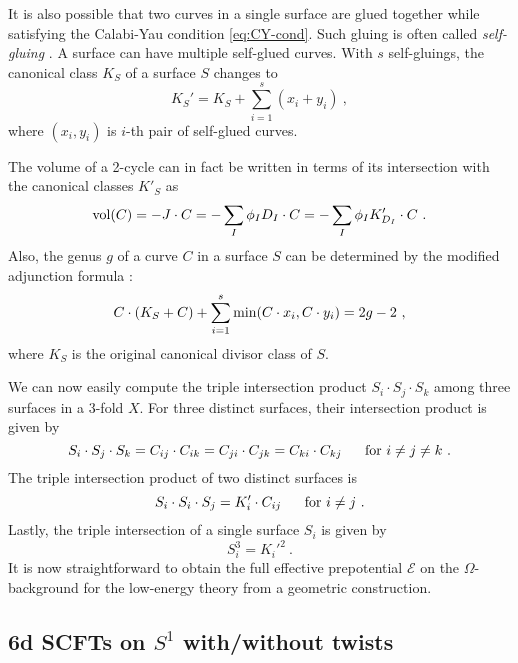 It is also possible that two curves in a single surface are glued together while satisfying the Calabi-Yau condition \eqref{eq:CY-cond}. Such gluing is often called {\it self-gluing} \cite{Jefferson:2018irk}. A surface can have multiple self-glued curves. With $s$ self-gluings, the canonical class $K_S$ of a surface $S$ changes to
\begin{equation}
	K_S' = K_S + \sum_{i=1}^s (x_i+y_i) \ ,
\end{equation}
where $(x_i,y_i)$ is $i$-th pair of self-glued curves.

The volume of a 2-cycle can in fact be written in terms of its intersection with the canonical classes $K'_S$ as
\begin{equation}
	{\rm vol}(C) = -J\cdot C = -\sum_I\phi_I D_I\cdot C = -\sum_I\phi_I K_{D_I}' \cdot C \ .
\end{equation}
Also, the genus $g$ of a curve $C$ in a surface $S$ can be determined by the modified adjunction formula \cite{Bhardwaj:2019fzv,Bhardwaj:2020gyu}:
\begin{equation}
	C\cdot (K_S +C)+\sum_{i=1}^s{\rm min}(C\cdot x_i,C\cdot y_i)=2g-2\ ,
\end{equation}
where $K_S$ is the original canonical divisor class of $S$.

We can now easily compute the triple intersection product $S_i\cdot S_j \cdot S_k$ among three surfaces in a 3-fold $X$. For three distinct surfaces, their intersection product is given by
\begin{equation}
	S_i\cdot S_j\cdot S_k = C_{ij} \cdot C_{ik} = C_{ji} \cdot C_{jk} = C_{ki} \cdot C_{kj} \ \quad \ {\rm for}\ i\neq j\neq k \ .
\end{equation}
The triple intersection product of two distinct surfaces is 
\begin{equation}
	S_i\cdot S_i \cdot S_j = K'_i\cdot C_{ij} \ \quad \ {\rm for}\ i\neq j \ .
\end{equation}
Lastly, the triple intersection of a single surface $S_i$ is given by
\begin{equation}
	S_i^3 = K_i'^2\ .\label{eq:triple intersection}
\end{equation}
It is now straightforward to obtain the full effective prepotential $\mathcal{E}$ on the $\Omega$-background for the low-energy theory from a geometric construction.


\subsection{\texorpdfstring{6d SCFTs on $S^1$ with/without twists}{6d SCFTs on S1 with/without twists}}


